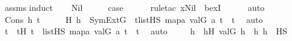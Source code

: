 \begin{isabellebody}
\ assms\isanewline
{}\isamarkupfalse%
{\isacharparenleft}{\kern0pt}induct{\isacharparenright}{\kern0pt}\isanewline
\ \ \isamarkupfalse%
\ Nil\isanewline
\ \ \isamarkupfalse%
\ \isamarkupfalse%
\ {\isacharquery}{\kern0pt}case\ \isanewline
\ \ \ \ \isamarkupfalse%
{\isacharparenleft}{\kern0pt}rule{\isacharunderscore}{\kern0pt}tac\ x{\isacharequal}{\kern0pt}Nil\ \ bexI{\isacharparenright}{\kern0pt}\isanewline
\ \ \ \ \isamarkupfalse%
\ auto\isanewline
{}\isamarkupfalse%
\isanewline
\ \ \isamarkupfalse%
\ {\isacharparenleft}{\kern0pt}Cons\ h\ t{\isacharparenright}{\kern0pt}\isanewline
\ \ \isamarkupfalse%
\ \isamarkupfalse%
\ H{\isacharcolon}{\kern0pt}\ {\isachardoublequoteopen}h\ {\isasymin}\ SymExt{\isacharparenleft}{\kern0pt}G{\isacharparenright}{\kern0pt}\ {\isasymand}\ {\isacharparenleft}{\kern0pt}{\isasymexists}t{\isacharprime}{\kern0pt}{\isasymin}list{\isacharparenleft}{\kern0pt}HS{\isacharparenright}{\kern0pt}{\isachardot}{\kern0pt}\ map{\isacharparenleft}{\kern0pt}{\isasymlambda}a{\isachardot}{\kern0pt}\ val{\isacharparenleft}{\kern0pt}G{\isacharcomma}{\kern0pt}\ a{\isacharparenright}{\kern0pt}{\isacharcomma}{\kern0pt}\ t{\isacharprime}{\kern0pt}{\isacharparenright}{\kern0pt}\ {\isacharequal}{\kern0pt}\ t{\isacharparenright}{\kern0pt}{\isachardoublequoteclose}\ \isamarkupfalse%
\ auto\ \isanewline
\ \ \isamarkupfalse%
\ \isamarkupfalse%
\ t{\isacharprime}{\kern0pt}\ \ t{\isacharprime}{\kern0pt}H{\isacharcolon}{\kern0pt}\ {\isachardoublequoteopen}t{\isacharprime}{\kern0pt}\ {\isasymin}\ list{\isacharparenleft}{\kern0pt}HS{\isacharparenright}{\kern0pt}{\isachardoublequoteclose}\ {\isachardoublequoteopen}map{\isacharparenleft}{\kern0pt}{\isasymlambda}a{\isachardot}{\kern0pt}\ val{\isacharparenleft}{\kern0pt}G{\isacharcomma}{\kern0pt}\ a{\isacharparenright}{\kern0pt}{\isacharcomma}{\kern0pt}\ t{\isacharprime}{\kern0pt}{\isacharparenright}{\kern0pt}\ {\isacharequal}{\kern0pt}\ t{\isachardoublequoteclose}\ \isamarkupfalse%
\ auto\ \isanewline
\ \ \isamarkupfalse%
\ h{\isacharprime}{\kern0pt}\ \ h{\isacharprime}{\kern0pt}H\ {\isacharcolon}{\kern0pt}{\isachardoublequoteopen}val{\isacharparenleft}{\kern0pt}G{\isacharcomma}{\kern0pt}\ h{\isacharprime}{\kern0pt}{\isacharparenright}{\kern0pt}\ {\isacharequal}{\kern0pt}\ h{\isachardoublequoteclose}\ {\isachardoublequoteopen}h{\isacharprime}{\kern0pt}\ {\isasymin}\ HS{\isachardoublequoteclose}\ \isanewline

\end{isabellebody}
